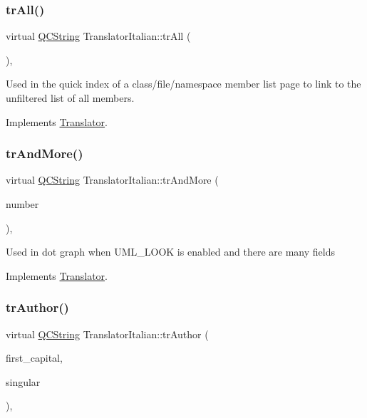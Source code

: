 \subsubsection{\texorpdfstring{trAll()}{trAll()}}
{\footnotesize\ttfamily virtual \mbox{\hyperlink{class_q_c_string}{Q\+C\+String}} Translator\+Italian\+::tr\+All (\begin{DoxyParamCaption}{ }\end{DoxyParamCaption})\hspace{0.3cm}{\ttfamily [inline]}, {\ttfamily [virtual]}}

Used in the quick index of a class/file/namespace member list page to link to the unfiltered list of all members. 

Implements \mbox{\hyperlink{class_translator}{Translator}}.

\mbox{\label{class_translator_italian_a776e83ad4d9ba9d59696dd9256b4b1b8}} 
\subsubsection{\texorpdfstring{trAndMore()}{trAndMore()}}
{\footnotesize\ttfamily virtual \mbox{\hyperlink{class_q_c_string}{Q\+C\+String}} Translator\+Italian\+::tr\+And\+More (\begin{DoxyParamCaption}\item[{const \mbox{\hyperlink{class_q_c_string}{Q\+C\+String}} \&}]{number }\end{DoxyParamCaption})\hspace{0.3cm}{\ttfamily [inline]}, {\ttfamily [virtual]}}

Used in dot graph when U\+M\+L\+\_\+\+L\+O\+OK is enabled and there are many fields 

Implements \mbox{\hyperlink{class_translator}{Translator}}.

\mbox{\label{class_translator_italian_a08817047e60ed5e627bf670e716f8379}} 
\subsubsection{\texorpdfstring{trAuthor()}{trAuthor()}}
{\footnotesize\ttfamily virtual \mbox{\hyperlink{class_q_c_string}{Q\+C\+String}} Translator\+Italian\+::tr\+Author (\begin{DoxyParamCaption}\item[{bool}]{first\+\_\+capital,  }\item[{bool}]{singular }\end{DoxyParamCaption})\hspace{0.3cm}{\ttfamily [inline]}, {\ttfamily [virtual]}}

